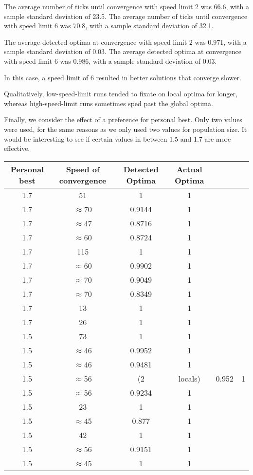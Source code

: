 \documentclass[12pt]{article}
\begin{document}
The average number of ticks until convergence with speed limit 2 was 66.6, with a sample standard deviation of 23.5.
The average number of ticks until convergence with speed limit 6 was 70.8, with a sample standard deviation of 32.1.

The average detected optima at convergence with speed limit 2 was 0.971, with a sample standard deviation of 0.03.
The average detected optima at convergence with speed limit 6 was 0.986, with a sample standard deviation of 0.03.

In this case, a speed limit of 6 resulted in better solutions that converge slower.

Qualitatively, low-speed-limit runs tended to fixate on local optima for longer, whereas high-speed-limit runs sometimes sped past the global optima.

Finally, we consider the effect of a preference for personal best. Only two values were used, for the same reasons as we only used two values for population size. It would be interesting to see if certain values in between 1.5 and 1.7 are more effective.

\begin{table}[h!]
\centering
\begin{tabular}{|c|c|c|c|c|c|}
\textbf{Personal best} & Speed of convergence & Detected Optima & Actual Optima \\ \hline
\hline
1.7 & 51 & 1 & 1 \\ \hline
1.7 & $\approx$70 & 0.9144 & 1 \\ \hline
1.7 & $\approx$47 & 0.8716 & 1 \\ \hline
1.7 & $\approx$60 & 0.8724 & 1 \\ \hline
1.7 & 115 & 1 & 1 \\ \hline
1.7 & $\approx$60 & 0.9902 & 1 \\ \hline
1.7 & $\approx$70 & 0.9049 & 1 \\ \hline
1.7 & $\approx$70 & 0.8349 & 1 \\ \hline
1.7 & 13 & 1 & 1 \\ \hline
1.7 & 26 & 1 & 1 \\ \hline
1.5 & 73 & 1 & 1 \\ \hline
1.5 & $\approx$46 & 0.9952 & 1 \\ \hline
1.5 & $\approx$46 & 0.9481 & 1 \\ \hline
1.5 & $\approx$56 & (2 & locals) & 0.952 & 1 \\ \hline
1.5 & $\approx$56 & 0.9234 & 1 \\ \hline
1.5 & 23 & 1 & 1 \\ \hline
1.5 & $\approx$45 & 0.877 & 1 \\ \hline
1.5 & 42 & 1 & 1 \\ \hline
1.5 & $\approx$56 & 0.9151 & 1 \\ \hline
1.5 & $\approx$45 & 1 & 1 \\ \hline
\end{tabular}
\end{table}
\end{document}
